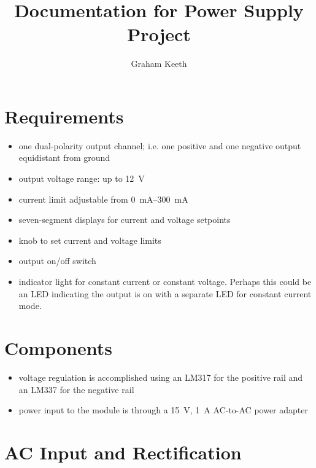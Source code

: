 \documentclass{article}
\author{Graham Keeth}
\title{Documentation for Power Supply Project}
\begin{document}
\maketitle
\section{Requirements}
\begin{itemize}
  \item{one dual-polarity output channel; i.e. one positive and one negative output equidistant from ground}
  \item{output voltage range: up to \SI{12}{\volt}}
  \item{current limit adjustable from \SIrange{0}{300}{\milli\ampere}}
  \item{seven-segment displays for current and voltage setpoints}
  \item{knob to set current and voltage limits}
  \item{output on/off switch}
  \item{indicator light for constant current or constant voltage. Perhaps this
          could be an LED indicating the output is on with a separate LED for
          constant current mode.}
\end{itemize}

\section{Components}
\begin{itemize}
  \item{voltage regulation is accomplished using an LM317 for the positive rail
    and an LM337 for the negative rail}
  \item{power input to the module is through a \SI{15}{\volt}, \SI{1}{\ampere}
    AC-to-AC power adapter}
\end{itemize}

\section{AC Input and Rectification}
\end{document}
